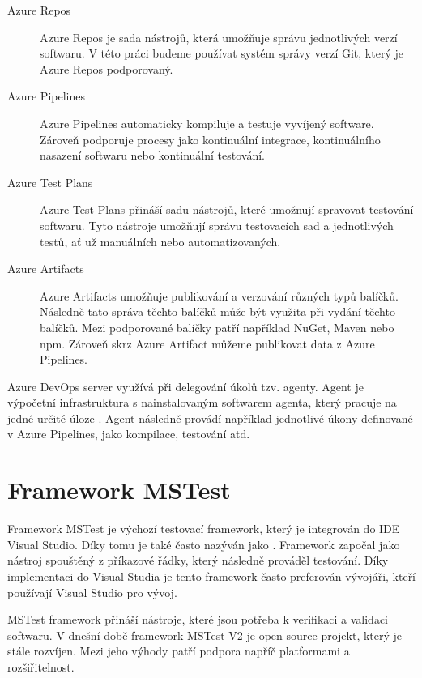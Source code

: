 \begin{description}
    \item[Azure Repos] Azure Repos je sada nástrojů, která umožňuje správu jednotlivých verzí softwaru. V této práci budeme používat systém správy verzí Git, který je Azure Repos podporovaný. \cite{azure_repos}
    \item[Azure Pipelines] Azure Pipelines automaticky kompiluje a testuje vyvíjený software. Zároveň podporuje procesy jako kontinuální integrace, kontinuálního nasazení softwaru nebo kontinuální testování. \cite{azure_pipelines}
    \\ 
    \item[Azure Test Plans] Azure Test Plans přináší sadu nástrojů, které umožnují spravovat testování softwaru. Tyto nástroje umožňují správu testovacích sad a jednotlivých testů, ať už manuálních nebo automatizovaných. \cite{azure_test_plans}
    \item[Azure Artifacts] Azure Artifacts umožňuje publikování a verzování různých typů balíčků. Následně tato správa těchto balíčků může být využita při vydání těchto balíčků. Mezi podporované balíčky patří například NuGet, Maven nebo npm. Zároveň skrz Azure Artifact můžeme publikovat data z Azure Pipelines. \cite{azure_artifacts}
\end{description}

Azure DevOps server využívá při delegování úkolů tzv. agenty. Agent je výpočetní infrastruktura s nainstalovaným softwarem agenta, který pracuje na jedné určité úloze \cite{agent_docs}. Agent následně provádí například jednotlivé úkony definované v Azure Pipelines, jako kompilace, testování atd.

\section{Framework MSTest}

Framework MSTest je výchozí testovací framework, který je integrován do IDE Visual Studio. Díky tomu je také často nazýván jako . Framework započal jako nástroj spouštěný z příkazové řádky, který následně prováděl testování. Díky implementaci do Visual Studia je tento framework často preferován vývojáři, kteří používají Visual Studio pro vývoj. 

MSTest framework přináší nástroje, které jsou potřeba k verifikaci a validaci softwaru. V dnešní době framework MSTest V2 je open-source projekt, který je stále rozvíjen. Mezi jeho výhody patří podpora napříč platformami a rozšiřitelnost. \cite{mstest_descr}


